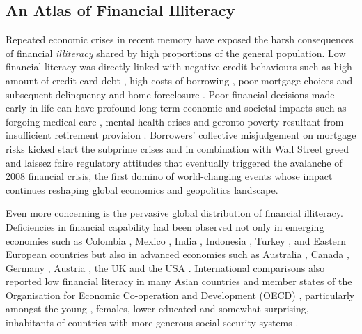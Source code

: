 \documentclass[review]{elsarticle}
\begin{document}
\subsection{An Atlas of Financial Illiteracy}

Repeated economic crises in recent memory have exposed the harsh consequences of financial \emph{illiteracy} shared by high proportions of the general population. Low financial literacy was directly linked with negative credit behaviours such as high amount of credit card debt \citep{norvilitis:2010}, high costs of borrowing \citep{huston:2012, pak:2018}, poor mortgage choices \citep{cox:2015} and subsequent delinquency and home foreclosure \citep{agarwal:2015a, gerardi:2010}. Poor financial decisions made early in life can have profound long-term economic and societal impacts \citep{montoya:2013} such as forgoing medical care \citep{lusardi:2015}, mental health crises \citep{stone:2018} and geronto-poverty resultant from insufficient retirement provision \citep{lusardi:2007, lusardi:2008}. Borrowers' collective misjudgement on mortgage risks kicked start the subprime crises and in combination with Wall Street greed and laissez faire regulatory attitudes that eventually triggered the avalanche of 2008 financial crisis, the first domino of world-changing events whose impact continues reshaping global economics and geopolitics landscape.

Even more concerning is the pervasive global distribution of financial illiteracy. Deficiencies in financial capability had been observed not only in emerging economies \citep{karakurumozdemir:2019} such as Colombia \citep{caoalvira:2020}, Mexico \citep{arceogomez:2017, bohm:2021}, India \citep{agarwal:2015b, kiliyanni:2016, utkarsh:2020}, Indonesia \citep{cole:2009, khoirunnisaa:2020}, Turkey \citep{akbenselcuk:2014}, and Eastern European countries \citep{belas:2016, opletalova:2015, reiter:2020} but also in advanced economies such as Australia \citep{ali:2014, taylor:2013, thomson:2017}, Canada \citep{boisclair:2017}, Germany \citep{bucherkoenen:2017, erner:2016}, Austria \citep{silgoner:2015}, the UK \citep{barnard:2021} and the USA \citep{breitbach:2016, gale:2012, lusardi:2010}. International comparisons also reported low financial literacy in many Asian countries \citep{yoshino:2015} and member states of the Organisation for Economic Co-operation and Development (OECD) \citep{cupak:2018a, lusardi:2015a}, particularly amongst the young \citep{debeckker:2019}, females, lower educated \citep{klapper:2019} and somewhat surprising, inhabitants of countries with more generous social security systems \citep{jappelli:2010}.
\end{document}
